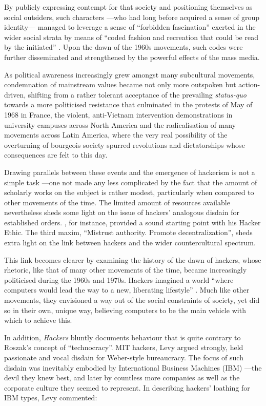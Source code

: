 \noindent

By publicly expressing contempt for that society and positioning themselves as social outsiders, such characters ---who had long before acquired a sense of group identity--- managed to leverage a sense of ``forbidden fascination'' exerted in the wider social strata by means of ``coded fashion and recreation that could be read by the initiated'' \citep[p.17]{moore07}. Upon the dawn of the 1960s movements, such codes were further disseminated and strengthened by the powerful effects of the mass media.

As political awareness increasingly grew amongst many subcultural movements, condemnation of mainstream values became not only more outspoken but action-driven, shifting from a rather tolerant acceptance of the prevailing \textit{status-quo} towards a more politicised resistance that culminated in the protests of May of 1968 in France, the violent, anti-Vi\-et\-nam intervention demonstrations in university campuses across North America and the radicalisation of many movements across Latin America, where the very real possibility of the overturning of bourgeois society spurred revolutions and dictatorships whose consequences are felt to this day.

Drawing parallels between these events and the emergence of hackerism is not a simple task ---one not made any less complicated by the fact that the amount of scholarly works on the subject is rather modest, particularly when compared to other movements of the time. The limited amount of resources available nevertheless sheds some light on the issue of hackers' analogous disdain for established orders. \citet{levy84}, for instance, provided a sound starting point with his Hacker Ethic. The third maxim, ``Mistrust authority. Promote decentralization'', sheds extra light on the link between hackers and the wider countercultural spectrum.

This link becomes clearer by examining the history of the dawn of hackers, whose rhetoric, like that of many other movements of the time, became increasingly politicised during the 1960s and 1970s. Hackers imagined a world ``where computers would lead the way to a new, liberating lifestyle'' \citep[p.168]{levy84}. Much like other movements, they envisioned a way out of the social constraints of society, yet did so in their own, unique way, believing computers to be the main vehicle with which to achieve this.

In addition, \textit{Hackers} bluntly documents behaviour that is quite contrary to Roszak's concept of ``technocracy''. MIT hackers, Levy argued strongly, held passionate and vocal disdain for Weber-style bureaucracy. The focus of such disdain was inevitably embodied by International Business Machines (IBM) ---the devil they knew best, and later by countless more companies as well as the corporate culture they seemed to represent. In describing hackers' loathing for IBM types, Levy commented:

